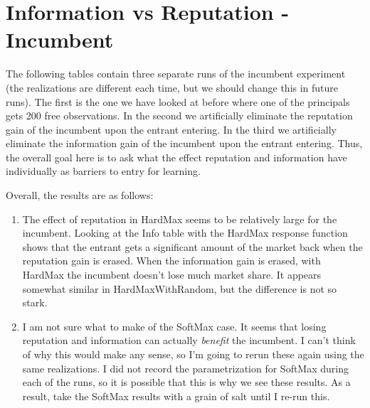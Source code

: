 \documentclass[11pt,letterpaper]{article}
\begin{document}
\section*{Information vs Reputation - Incumbent}

The following tables contain three separate runs of the incumbent experiment (the realizations are different each time, but we should change this in future runs). The first is the one we have looked at before where one of the principals gets 200 free observations. In the second we artificially eliminate the reputation gain of the incumbent upon the entrant entering. In the third we artificially eliminate the information gain of the incumbent upon the entrant entering. Thus, the overall goal here is to ask what the effect reputation and information have individually as barriers to entry for learning.

Overall, the results are as follows:
\begin{enumerate}
\item The effect of reputation in HardMax seems to be relatively large for the incumbent. Looking at the Info table with the HardMax response function shows that the entrant gets a significant amount of the market back when the reputation gain is erased. When the information gain is erased, with HardMax the incumbent doesn't lose much market share. It appears somewhat similar in HardMaxWithRandom, but the difference is not so stark.
\item I am not sure what to make of the SoftMax case. It seems that losing reputation and information can actually \textit{benefit} the incumbent. I can't think of why this would make any sense, so I'm going to rerun these again using the same realizations. I did not record the parametrization for SoftMax during each of the runs, so it is possible that this is why we see these results. As a result, take the SoftMax results with a grain of salt until I re-run this.
\end{enumerate}



\end{document}
